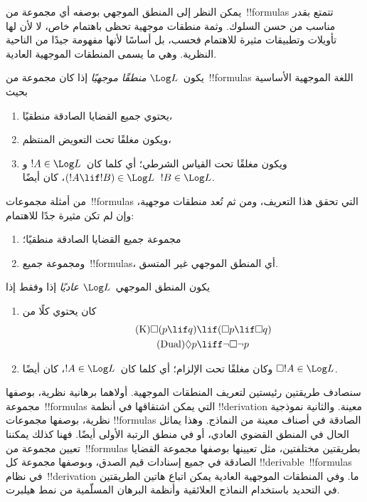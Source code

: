 \documentclass[../../../include/open-logic-section]{subfiles}
\begin{document}


يمكن النظر إلى المنطق الموجهي بوصفه أي مجموعة من~!!{formula}s تتمتع
بقدر مناسب من حسن السلوك. وثمة منطقات موجهية تحظى باهتمام خاص، لا لأن
لها تأويلات وتطبيقات مثيرة للاهتمام فحسب، بل أساسًا لأنها مفهومة جيدًا
من الناحية النظرية. وهي ما يسمى المنطقات الموجهية العادية.

\begin{defn}
يكون~$\Log L$ \emph{منطقًا موجهيًا} إذا كان مجموعة من~!!{formula}s
اللغة الموجهية الأساسية بحيث
\begin{enumerate}
\item يحتوي جميع القضايا الصادقة منطقيًا،
\item ويكون مغلقًا تحت التعويض المنتظم،
\item ويكون مغلقًا تحت القياس الشرطي؛ أي كلما كان~$!A \in \Log L$ و
  $(!A \lif !B) \in \Log L$، كان أيضًا~$!B \in \Log L$.
\end{enumerate}
\end{defn}

\begin{ex}
من أمثلة مجموعات~!!{formula}s التي تحقق هذا التعريف، ومن ثم تُعد
منطقات موجهية، وإن لم تكن مثيرة جدًا للاهتمام:
\begin{enumerate}
\item مجموعة جميع القضايا الصادقة منطقيًا؛
\item ومجموعة جميع~!!{formula}s، أي المنطق الموجهي غير المتسق.
\end{enumerate}
\end{ex}

\begin{defn}
يكون المنطق الموجهي~$\Log L$ \emph{عاديًا} إذا وفقط إذا
\begin{enumerate}
\item كان يحتوي كلًا من
\begin{align}
\tag{K} \Box(p \lif q) & \lif (\Box p \lif \Box q) \\
\tag{Dual} \Diamond p & \liff \lnot \Box \lnot p
\end{align}
\item وكان مغلقًا تحت الإلزام؛ أي كلما كان~$!A \in \Log L$، كان أيضًا
  $\Box !A \in \Log L$.
\end{enumerate}
\end{defn}

سنصادف طريقتين رئيستين لتعريف المنطقات الموجهية. أولاهما برهانية
نظرية، بوصفها مجموعة~!!{formula}s التي يمكن اشتقاقها في أنظمة
!!{derivation} معينة. والثانية نموذجية نظرية، بوصفها مجموعات
!!{formula}s الصادقة في أصناف معينة من النماذج. وهذا يماثل الحال في
المنطق القضوي العادي، أو في منطق الرتبة الأولى أيضًا. فهنا كذلك يمكننا
تعيين مجموعة من~!!{formula}s بطريقتين مختلفتين، مثل تعيينها بوصفها
مجموعة القضايا الصادقة في جميع إسنادات قيم الصدق، وبوصفها مجموعة كل
!!{derivable}~!!{formula}s في نظام~!!{derivation} ما. وفي المنطقات
الموجهية العادية يمكن اتباع هاتين الطريقتين في التحديد باستخدام
النماذج العلائقية وأنظمة البرهان المسلّمية من نمط هيلبرت.
\end{document}
